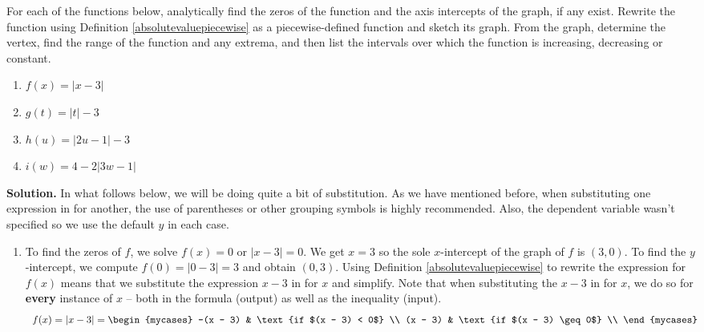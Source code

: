 \documentclass{ximera}
\begin{document}
\begin{example}   \label{absvaluegraph1} For each of the functions below, analytically find the zeros of the function and the axis intercepts of the graph, if any exist.  Rewrite the function using Definition \ref{absolutevaluepiecewise} as a piecewise-defined function and sketch its graph.  From the graph, determine the vertex, find the range of the function and any extrema, and then list the intervals over which the function is increasing, decreasing or constant.

\begin{multicols}{4}
\begin{enumerate}

\item  $f(x) = |x - 3|$
\item  $g(t) = |t| - 3$
\item  $h(u) = |2u - 1| - 3$
\item  $i(w) = 4 - 2|3w - 1|$ 

\end{enumerate}
\end{multicols}

{\bf Solution.}  In what follows below, we will be doing quite a bit of substitution.  As we have mentioned before, when substituting one expression in for another, the use of parentheses or other grouping symbols is highly recommended.  Also, the dependent variable wasn't specified so we use the default $y$ in each case.

\begin{enumerate}

\item  To find the zeros of $f$, we solve $f(x) = 0$ or $|x - 3| = 0$.  We get $x = 3$ so  the sole $x$-intercept of the graph of $f$ is $(3, 0)$.  To find the $y$-intercept, we compute $f(0) = |0 - 3| = 3$ and obtain $(0,3)$.     Using Definition \ref{absolutevaluepiecewise} to rewrite the expression for $f(x)$ means that we substitute the expression $x - 3$ in for $x$ and simplify.  Note that when substituting the $x - 3$ in for $x$,  we do so for \textbf{every} instance of $x$  -- both in the formula (output) as well as the inequality (input). \[ \begin{array}{ccc}

f(x) = |x - 3| = \begin{mycases} 
      -(x - 3) &  \text{if $(x - 3) < 0$} \\
      (x - 3)  & \text{if $(x - 3) \geq 0$} \\
   \end{mycases} &
   

\end{array}\]
\end{enumerate}
\end{example}
\end{document}
